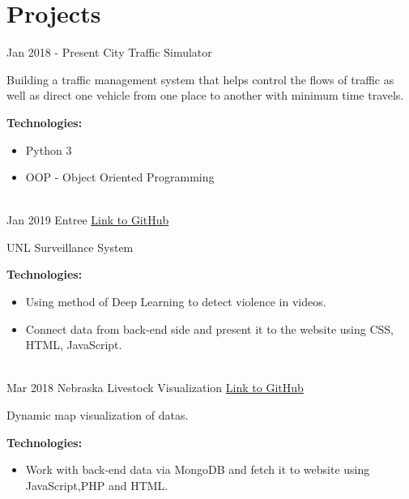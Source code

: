 \documentclass[letterpaper]{twentysecondcv} %
\begin{document}
\section{Projects}
\begin{twenty}
	\twentyitem
    	{Jan 2018 - }
		{Present}
        {City Traffic Simulator}
        {} %
        {}
        {
       	Building a traffic management system that helps control the flows of traffic as well as direct one vehicle from one place to another with minimum time travels.
       	
       	\textbf{Technologies:}
        {\begin{itemize}
        \item Python 3
        \item OOP - Object Oriented Programming
		\end{itemize}}
        }
    \\
        \twentyitem
    	{Jan 2019}
		{}
        {Entree}
        {\href{https://datduyng.github.io/cornhack2019/}{Link to GitHub}} %
        {}
        {
       	UNL Surveillance System
       	
       	\textbf{Technologies:}
        {\begin{itemize}
        \item Using method of Deep Learning to detect violence in videos.
        \item Connect data from back-end side and present it to the website using CSS, HTML, JavaScript.
		\end{itemize}}
        }
        \\
    \twentyitem
    	{Mar 2018}
		{}
        {Nebraska Livestock Visualization}
        {\href{https://github.com/HuyNVuong/Nebraska-livestock-Visualisation}{Link to GitHub}} %
        {}
        {
       	Dynamic map visualization of datas.
       	
       	\textbf{Technologies:}
        {\begin{itemize}
        \item Work with back-end data via MongoDB and fetch it to website using JavaScript,PHP and HTML.
		\end{itemize}}
        }

\end{twenty}
\end{document}

